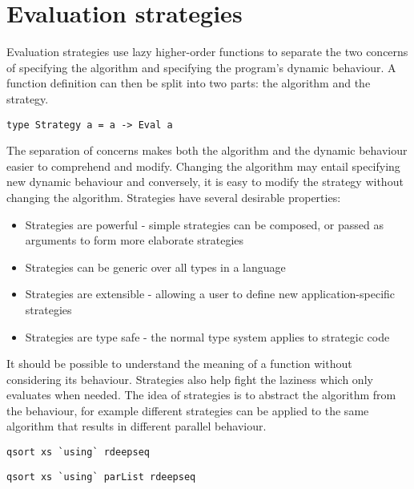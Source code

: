 \documentclass[CS4204-Notes.tex]{subfiles}
\begin{document}
\section{Evaluation strategies}
Evaluation strategies use lazy higher-order functions to separate the two concerns of specifying the algorithm and specifying the program's dynamic behaviour. A function definition can then be split into two parts: the algorithm and the strategy.
\begin{lstlisting}[caption={The strategy type specifies the ``evaluation'' type.}]
type Strategy a = a -> Eval a
\end{lstlisting}
The separation of concerns makes both the algorithm and the dynamic behaviour easier to comprehend and modify. Changing the algorithm may entail specifying new dynamic behaviour and conversely, it is easy to modify the strategy without changing the algorithm. Strategies have several desirable properties:
\begin{itemize}
\item Strategies are powerful - simple strategies can be composed, or passed as arguments to form more elaborate strategies
\item Strategies can be generic over all types in a language
\item Strategies are extensible - allowing a user to define new application-specific strategies
\item Strategies are type safe - the normal type system applies to strategic code
\end{itemize}
It should be possible to understand the meaning of a function without considering its behaviour. Strategies also help fight the laziness which only evaluates when needed.
\n
The idea of strategies is to abstract the algorithm from the behaviour, for example different strategies can be applied to the same algorithm that results in different parallel behaviour.
\begin{lstlisting}[caption={Evaluate \texttt{qsort xs} completely}]
qsort xs `using` rdeepseq
\end{lstlisting}
\begin{lstlisting}[caption={Evaluate \texttt{qsort xs} as a data parallel computation}]
qsort xs `using` parList rdeepseq
\end{lstlisting}
\end{document}

